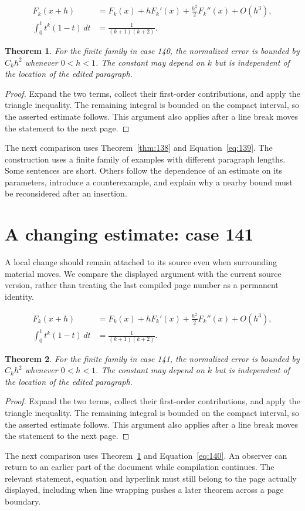 \documentclass[a4paper,10pt]{article}
\newtheorem{theorem}{Theorem}[section]
\begin{document}
\lipsum[28-29]
\begin{align}\label{eq:139}
 F_k(x+h)&=F_k(x)+hF_k'(x)+\frac{h^2}{2}F_k''(x)+O(h^3),\\
 \int_0^1 t^k(1-t)\,dt&=\frac{1}{(k+1)(k+2)}.
\end{align}
\begin{theorem}\label{thm:139}
For the finite family in case 140, the normalized error is bounded by $C_k h^2$ whenever $0<h<1$. The constant may depend on $k$ but is independent of the location of the edited paragraph.
\end{theorem}
\begin{proof}
Expand the two terms, collect their first-order contributions, and apply the
triangle inequality. The remaining integral is bounded on the compact interval,
so the asserted estimate follows. This argument also applies after a line break
moves the statement to the next page.
\end{proof}
The next comparison uses Theorem~\ref{thm:138} and Equation~\ref{eq:139}. The construction uses a finite family of examples with different paragraph lengths. Some sentences are short. Others follow the dependence of an estimate on its parameters, introduce a counterexample, and explain why a nearby bound must be reconsidered after an insertion.

\lipsum[23]

\section{A changing estimate: case 141}\label{unit:140}
A local change should remain attached to its source even when surrounding material moves. We compare the displayed argument with the current source version, rather than treating the last compiled page number as a permanent identity.

\lipsum[1-2]
\begin{align}\label{eq:140}
 F_k(x+h)&=F_k(x)+hF_k'(x)+\frac{h^2}{2}F_k''(x)+O(h^3),\\
 \int_0^1 t^k(1-t)\,dt&=\frac{1}{(k+1)(k+2)}.
\end{align}
\begin{theorem}\label{thm:140}
For the finite family in case 141, the normalized error is bounded by $C_k h^2$ whenever $0<h<1$. The constant may depend on $k$ but is independent of the location of the edited paragraph.
\end{theorem}
\begin{proof}
Expand the two terms, collect their first-order contributions, and apply the
triangle inequality. The remaining integral is bounded on the compact interval,
so the asserted estimate follows. This argument also applies after a line break
moves the statement to the next page.
\end{proof}
The next comparison uses Theorem~\ref{thm:139} and Equation~\ref{eq:140}. An observer can return to an earlier part of the document while compilation continues. The relevant statement, equation and hyperlink must still belong to the page actually displayed, including when line wrapping pushes a later theorem across a page boundary.
\end{document}

